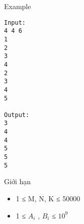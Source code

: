 Example
\begin{verbatim}
Input:
4 4 6
1
2
3
4
2
3
4
5

Output:
3
4
4
5
5
5
\end{verbatim}
Giới hạn
\begin{itemize}
	\item     1 ≤ M, N, K ≤ 50000   
	\item     1 ≤ $A_{i}$    , $B_{i}$    ≤ $10^{9}$
\end{itemize}